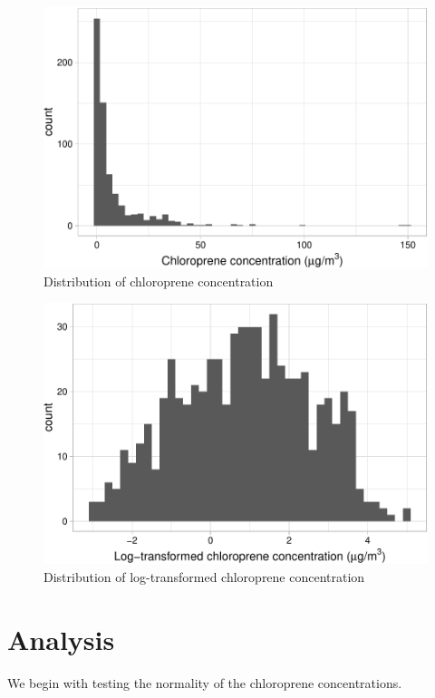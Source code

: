 \documentclass[12pt,]{article}
\begin{document}
\begin{figure}
\centering
\includegraphics{Li_ENV872_Project_files/figure-latex/unnamed-chunk-3-1.pdf}
\caption{Distribution of chloroprene concentration}
\end{figure}

\begin{figure}
\centering
\includegraphics{Li_ENV872_Project_files/figure-latex/unnamed-chunk-4-1.pdf}
\caption{Distribution of log-transformed chloroprene concentration}
\end{figure}

\newpage

\section{Analysis}\label{analysis}

We begin with testing the normality of the chloroprene concentrations.
\end{document}
